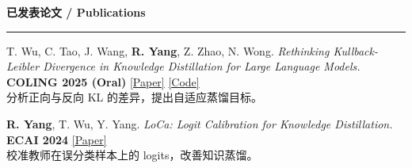 \documentclass[UTF8,fontset=fandol,11pt,a4paper]{ctexart}
\newcommand{\venuebadge}[1]{\begingroup\setlength{\fboxsep}{1.5pt}\colorbox{venuefill}{\textcolor{venuetext}{\bfseries #1}}\endgroup}
\newenvironment{rSection}[1]{
  \Needspace{7\baselineskip}\medskip
  \textbf{#1}\smallskip\hrule\smallskip
}{\par}
\begin{document}
\begin{rSection}{已发表论文 / Publications}
\begin{enumerate}[label={[\arabic*]}]
\item\begin{samepage} T. Wu, C. Tao, J. Wang, \textbf{R. Yang}, Z. Zhao, N. Wong. \textit{Rethinking Kullback-Leibler Divergence in Knowledge Distillation for Large Language Models.} \venuebadge{COLING 2025 (Oral)} \href{https://aclanthology.org/2025.coling-main.383/}{[Paper]} \href{https://github.com/wutaiqiang/LLM_KD_AKL}{[Code]}\\[1pt]{\textcolor{summarytext}{分析正向与反向 KL 的差异，提出自适应蒸馏目标。}}\par\end{samepage}
\item\begin{samepage} \textbf{R. Yang}, T. Wu, Y. Yang. \textit{LoCa: Logit Calibration for Knowledge Distillation.} \venuebadge{ECAI 2024} \href{https://doi.org/10.3233/FAIA240767}{[Paper]}\\[1pt]{\textcolor{summarytext}{校准教师在误分类样本上的 logits，改善知识蒸馏。}}\par\end{samepage}
\end{enumerate}\end{rSection}\normalsize
\end{document}

